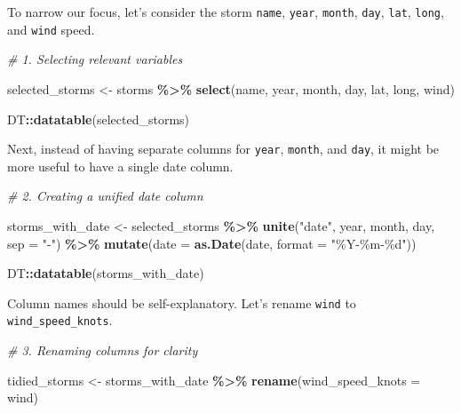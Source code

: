 \documentclass[
]{book}
\newenvironment{Shaded}{\begin{snugshade}}{\end{snugshade}}
\newcommand{\AttributeTok}[1]{\textcolor[rgb]{0.13,0.29,0.53}{#1}}
\newcommand{\CommentTok}[1]{\textcolor[rgb]{0.56,0.35,0.01}{\textit{#1}}}
\newcommand{\FunctionTok}[1]{\textcolor[rgb]{0.13,0.29,0.53}{\textbf{#1}}}
\newcommand{\NormalTok}[1]{#1}
\newcommand{\OtherTok}[1]{\textcolor[rgb]{0.56,0.35,0.01}{#1}}
\newcommand{\SpecialCharTok}[1]{\textcolor[rgb]{0.81,0.36,0.00}{\textbf{#1}}}
\newcommand{\StringTok}[1]{\textcolor[rgb]{0.31,0.60,0.02}{#1}}
\begin{document}
To narrow our focus, let's consider the storm \texttt{name}, \texttt{year}, \texttt{month}, \texttt{day}, \texttt{lat}, \texttt{long}, and \texttt{wind} speed.

\begin{Shaded}
\begin{Highlighting}[]
\CommentTok{\# 1. Selecting relevant variables}

\NormalTok{selected\_storms }\OtherTok{\textless{}{-}}\NormalTok{ storms }\SpecialCharTok{\%\textgreater{}\%}
  \FunctionTok{select}\NormalTok{(name, year, month, day, lat, long, wind)}

\NormalTok{DT}\SpecialCharTok{::}\FunctionTok{datatable}\NormalTok{(selected\_storms)}
\end{Highlighting}
\end{Shaded}

Next, instead of having separate columns for \texttt{year}, \texttt{month}, and \texttt{day}, it might be more useful to have a single date column.

\begin{Shaded}
\begin{Highlighting}[]
\CommentTok{\# 2. Creating a unified date column}

\NormalTok{storms\_with\_date }\OtherTok{\textless{}{-}}\NormalTok{ selected\_storms }\SpecialCharTok{\%\textgreater{}\%}
  \FunctionTok{unite}\NormalTok{(}\StringTok{"date"}\NormalTok{, year, month, day, }\AttributeTok{sep =} \StringTok{"{-}"}\NormalTok{) }\SpecialCharTok{\%\textgreater{}\%}
  \FunctionTok{mutate}\NormalTok{(}\AttributeTok{date =} \FunctionTok{as.Date}\NormalTok{(date, }\AttributeTok{format =} \StringTok{"\%Y{-}\%m{-}\%d"}\NormalTok{))}

\NormalTok{DT}\SpecialCharTok{::}\FunctionTok{datatable}\NormalTok{(storms\_with\_date)}
\end{Highlighting}
\end{Shaded}

Column names should be self-explanatory. Let's rename \texttt{wind} to \texttt{wind\_speed\_knots}.

\begin{Shaded}
\begin{Highlighting}[]
\CommentTok{\# 3. Renaming columns for clarity}

\NormalTok{tidied\_storms }\OtherTok{\textless{}{-}}\NormalTok{ storms\_with\_date }\SpecialCharTok{\%\textgreater{}\%}
  \FunctionTok{rename}\NormalTok{(}\AttributeTok{wind\_speed\_knots =}\NormalTok{ wind)}
\end{Highlighting}
\end{Shaded}
\end{document}
